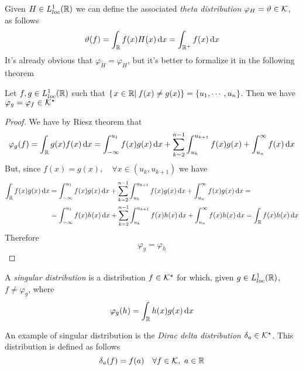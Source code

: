 \documentclass[../complete.tex]{subfiles}
\begin{document}
\begin{eg}
	Given $H\in L^1_{loc}(\mathbb{R})$ we can define the associated \textit{theta distribution} $\varphi_H=\vartheta\in\mathcal{K}$, as follows
	\begin{equation*}
		\vartheta(f)=\int_{\mathbb{R}}^{}f(x)H(x)\operatorname{d\!} x=\int_{\mathbb{R}^+}^{}f(x)\operatorname{d\!} x
	\end{equation*}
	It's already obvious that $\varphi_{\tilde{H}}=\varphi_H$, but it's better to formalize it in the following theorem
\end{eg}
\begin{thm}
	Let $f,g\in L^1_{loc}(\mathbb{R})$ such that $\left\{ \left.x\in\mathbb{R}\right|_{}f(x)\ne g(x) \right\}=\left\{ u_1,\cdots,u_n \right\}$. Then we have $\varphi_g=\varphi_f\in\mathcal{K}^\star$
\end{thm}
\begin{proof}
	We have by Riesz theorem that
	\begin{equation*}
		\varphi_g(f)=\int_{\mathbb{R}}^{}g(x)f(x)\operatorname{d\!} x=\int_{-\infty}^{u_1}f(x)g(x)\operatorname{d\!} x+\sum_{k=2}^{n-1}\int_{u_k}^{u_{k+1}}f(x)g(x)+\int_{u_n}^\infty f(x)\operatorname{d\!} x
	\end{equation*}
	But, since $f(x)=g(x),\quad\forall x\in(u_k,u_{k+1})$ we have
	\begin{equation*}
		\begin{aligned}
			\int_{\R}f(x)g(x)\diff x&=\int_{-\infty}^{u_1}f(x)g(x)\diff x+\sum_{k=2}^{n-1}\int_{u_k}^{u_{k+1}}f(x)g(x)\diff x+\int_{u_n}^{\infty}f(x)g(x)\diff x=\\
			&=\int_{-\infty}^{u_1}f(x)h(x)\diff x+\sum_{k=2}^{n-1}\int_{u_k}^{u_{k+1}}f(x)h(x)\diff x+\int_{u_n}^{\infty}f(x)h(x)\diff x=\int_{\R}^{}f(x)h(x)\diff x
		\end{aligned}
	\end{equation*}
	Therefore
	\begin{equation*}
		\varphi_g=\varphi_h
	\end{equation*}
\end{proof}
\begin{dfn}
	A \textit{singular distribution} is a distribution $f\in\mathcal{K}^\star$ for which, given $g\in L^1_{loc}(\mathbb{R})$, $f\ne\varphi_g$, where
	\begin{equation*}
		\varphi_g(h)=\int_{\mathbb{R}}^{}h(x)g(x)\operatorname{d\!} x
	\end{equation*}
\end{dfn}
\begin{dfn}
	An example of singular distribution is the \textit{Dirac delta distribution} $\delta_a\in\mathcal{K}^\star$. This distribution is defined as follows
	\begin{equation*}
		\delta_a(f)=f(a)\quad\forall f\in\K,\ a\in\R
	\end{equation*}
\end{dfn}
\end{document}
